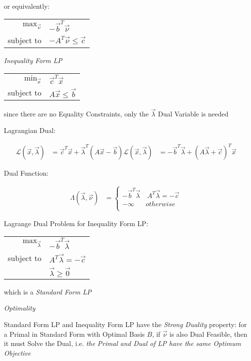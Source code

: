 or equivalently:

\begin{tabular}{r l}
  $\mathrm{max}_{\vec{\nu}}$ &
    $-\vec{b}^T\vec{\nu}$ \\
  subject to & $-A^T\vec{\nu} \leq \vec{c}$ \\
\end{tabular}


\emph{Inequality Form LP}

\begin{tabular}{r l}
  $\mathrm{min}_{\vec{x}}$ & $\vec{c}^T\vec{x}$      \\
  subject to               & $A\vec{x} \leq \vec{b}$ \\
\end{tabular}

since there are no Equality Constraints, only the $\vec{\lambda}$ Dual Variable
is needed

Lagrangian Dual:

\begin{align*}
  \mathcal{L}(\vec{x}, \vec{\lambda}) & =
    \vec{c}^T\vec{x} + \vec{\lambda}^T(A\vec{x} - \vec{b})
  \mathcal{L}(\vec{x}, \vec{\lambda}) & =
    -\vec{b}^T\vec{\lambda} + (A\vec{\lambda} + \vec{c})^T \vec{x}
\end{align*}

Dual Function:

\begin{align*}
  \Lambda(\vec{\lambda},\vec{\nu}) & = \begin{cases}
    -\vec{b}^T\vec{\lambda} & \ A^T\vec{\lambda} = -\vec{c} \\
    -\infty                 & otherwise \\
  \end{cases}
\end{align*}

Lagrange Dual Problem for Inequality Form LP:

\begin{tabular}{r l}
  $\mathrm{max}_{\vec{\lambda}}$ & $-\vec{b}^T\vec{\lambda}$ \\
  subject to & $A^T\vec{\lambda} = -\vec{c}$ \\
             & $\vec{\lambda} \geq \vec{0}$  \\
\end{tabular}

which is a \emph{Standard Form LP}


\emph{Optimality}

Standard Form LP and Inequality Form LP have the \emph{Strong Duality}
property: for a Primal in Standard Form with Optimal Basis $B$, if $\vec{\nu}$
is also Dual Feasible, then it must Solve the Dual, i.e. \emph{the Primal and
  Dual of LP have the same Optimum Objective}


